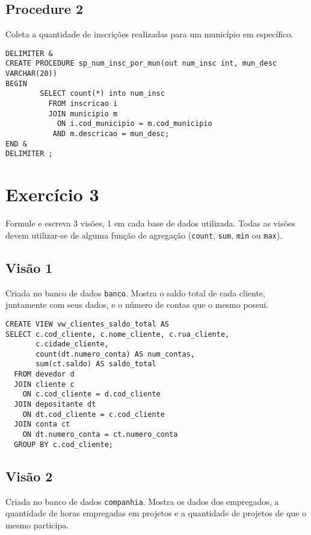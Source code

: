 \documentclass[article, a4paper, oneside, 11pt, english, brazil, sumario=tradicional]{abntex2}
\begin{document}
\subsection{Procedure 2}
\label{sec:org3833c0e}

Coleta a quantidade de inscrições realizadas para um município em específico.

\begin{verbatim}
DELIMITER &
CREATE PROCEDURE sp_num_insc_por_mun(out num_insc int, mun_desc VARCHAR(20))
BEGIN
        SELECT count(*) into num_insc
          FROM inscricao i
          JOIN municipio m
            ON i.cod_municipio = m.cod_municipio
           AND m.descricao = mun_desc;
END &
DELIMITER ;
\end{verbatim}

\section{Exercício 3}
\label{sec:org14a7d3b}

Formule e escreva 3  visões, 1 em cada base de dados  utilizada. Todas as visões
devem  utilizar-se de  alguma  função  de agregação  (\texttt{count},  \texttt{sum}, \texttt{min}  ou
\texttt{max}).

\subsection{Visão 1}
\label{sec:org72e550f}

Criada no banco de dados \texttt{banco}.
Mostra o saldo total  de cada cliente, juntamente com seus dados,  e o número de
contas que o mesmo possui.

\begin{verbatim}
CREATE VIEW vw_clientes_saldo_total AS
SELECT c.cod_cliente, c.nome_cliente, c.rua_cliente,
       c.cidade_cliente,
       count(dt.numero_conta) AS num_contas,
       sum(ct.saldo) AS saldo_total
  FROM devedor d
  JOIN cliente c
    ON c.cod_cliente = d.cod_cliente
  JOIN depositante dt
    ON dt.cod_cliente = c.cod_cliente
  JOIN conta ct
    ON dt.numero_conta = ct.numero_conta
  GROUP BY c.cod_cliente;
\end{verbatim}

\subsection{Visão 2}
\label{sec:orga1a05a9}

Criada no banco de dados \texttt{companhia}.
Mostra os dados dos empregados, a quantidade de horas empregadas em projetos e a
quantidade de projetos de que o mesmo participa.
\end{document}
